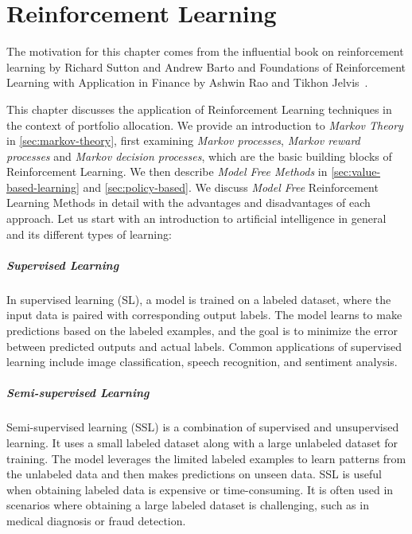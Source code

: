 \documentclass[../xlapes02]{subfiles}
\begin{document}
    \chapter{Reinforcement Learning}\label{ch:reinforcement-learning}

    The motivation for this chapter comes from the influential book on reinforcement learning by Richard Sutton and Andrew Barto and Foundations of Reinforcement Learning with Application in Finance by Ashwin Rao and Tikhon Jelvis~\cite{rao2022foundations, sutton2018reinforcement}.

    This chapter discusses the application of Reinforcement Learning techniques in the context of portfolio allocation. We provide an introduction to \emph{Markov Theory} in \cref{sec:markov-theory}, first examining \emph{Markov processes}, \emph{Markov reward processes} and \emph{Markov decision processes}, which are the basic building blocks of Reinforcement Learning. We then describe \emph{Model Free Methods} in \cref{sec:value-based-learning} and \cref{sec:policy-based}. We discuss \emph{Model Free} Reinforcement Learning Methods in detail with the advantages and disadvantages of each approach. Let us start with an introduction to artificial intelligence in general and its different types of learning:

    \paragraph{Supervised Learning}
    In supervised learning (SL), a model is trained on a labeled dataset, where the input data is paired with corresponding output labels. The model learns to make predictions based on the labeled examples, and the goal is to minimize the error between predicted outputs and actual labels. Common applications of supervised learning include image classification, speech recognition, and sentiment analysis.

    \paragraph{Semi-supervised Learning}
    Semi-supervised learning (SSL) is a combination of supervised and unsupervised learning. It uses a small labeled dataset along with a large unlabeled dataset for training. The model leverages the limited labeled examples to learn patterns from the unlabeled data and then makes predictions on unseen data. SSL is useful when obtaining labeled data is expensive or time-consuming. It is often used in scenarios where obtaining a large labeled dataset is challenging, such as in medical diagnosis or fraud detection.
\end{document}
